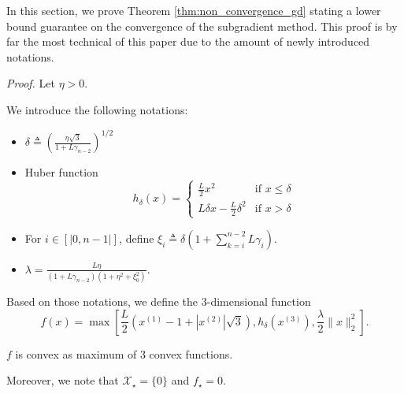 In this section, we prove Theorem \ref{thm:non_convergence_gd} stating a lower bound guarantee on the convergence of the subgradient method. This proof is by far the most technical of this paper due to the amount of newly introduced notations.

\nonconvergenceofgdwithlowerboundedstepsizes*

\noindent \textit{Proof.}
    Let $\eta > 0$.
    
    We introduce the following notations:
    \begin{itemize}
        \item $\delta \triangleq \left(\frac{\eta\sqrt{3}}{1+L\gamma_{n-2}}\right)^{1/2}$
        
        \item Huber function
        \begin{equation}
            h_{\delta}(x) = 
            \begin{cases}
                \frac{L}{2}x^2 & \text{if } x \leq \delta \\
                L \delta x - \frac{L}{2}\delta^2 & \text{if } x > \delta
            \end{cases}
            \label{eq:huber_functions}
        \end{equation}

        \item For $i \in [|0, n-1|]$, define $\xi_i \triangleq \delta \left( 1 + \sum_{k=i}^{n-2} L \gamma_i \right)$.
        
        \item $\lambda = \frac{L\eta}{(1 + L\gamma_{n-2})(1 + \eta^2 + \xi_0^2)}$.
    \end{itemize}
    
    Based on those notations, we define the $3$-dimensional function
    \begin{equation}
        f(x) = \max\left[\frac{L}{2}\left(x^{(1)} - 1 + |x^{(2)}|\sqrt{3}\right), h_{\delta}\left(x^{(3)}\right), \frac{\lambda}{2}\|x\|_2^2\right].
    \end{equation}
    
    $f$ is convex as maximum of 3 convex functions.
    
    Moreover, we note that $\mathcal{X}_\star = \lbrace 0 \rbrace$ and $f_\star = 0$.
    
